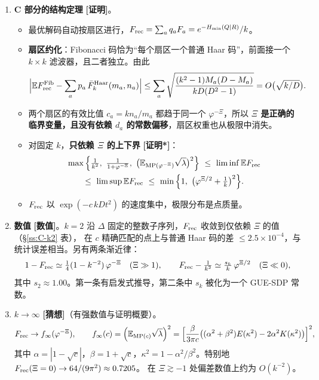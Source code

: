 \documentclass[11pt,a4paper,UTF8]{ctexart}
\newcommand{\E}{\mathbb{E}}
\newcommand{\Frec}{F_{\rm rec}}
\newcommand{\tagP}{\texorpdfstring{\textcolor{cP}{\textbf{[证明]}}}{[证明]}}
\newcommand{\tagPs}{\texorpdfstring{\textcolor{cPs}{\textbf{[证明*]}}}{[证明*]}}
\newcommand{\tagN}{\texorpdfstring{\textcolor{cN}{\textbf{[数值]}}}{[数值]}}
\newcommand{\tagC}{\texorpdfstring{\textcolor{cC}{\textbf{[猜想]}}}{[猜想]}}
\begin{document}
\begin{enumerate}[leftmargin=*,label=\textbf{\arabic*.}]
\item \textbf{C 部分的结构定理} \tagP。
\begin{itemize}
  \item 最优解码自动按扇区进行，$\Frec=\sum_aq_aF_a=e^{-H_{\min}(Q|R)}/k$。
  \item \textbf{扇区约化}：Fibonacci 码恰为“每个扇区一个普通 Haar 码”，前面接一个 $k\times k$ 滤波器，且二者独立。由此
  \[
  \Big|\E F^{\rm Fib}_{\rm rec}-\sum_ap_a\,\bar F^{\rm Haar}_k(m_a,n_a)\Big|
  \le\sum_a\sqrt{\frac{(k^2-1)M_a(D-M_a)}{kD(D^2-1)}}=O\big(\sqrt{k/D}\big).
  \]
  \item 两个扇区的有效比值 $c_a=kn_a/m_a$ 都趋于同一个 $\varphi^{-\Xi}$，所以 \textbf{$\Xi$ 是正确的临界变量，且没有依赖 $d_a$ 的常数偏移}，扇区权重也从极限中消失。
  \item 对固定 $k$，\textbf{只依赖 $\Xi$ 的上下界} \tagPs：
  \begin{multline*}
  \max\Big\{\tfrac1{k^2},\ \tfrac1{1+\varphi^{-\Xi}},\ \big(\E_{{\rm MP}(\varphi^{-\Xi})}\sqrt\lambda\big)^2\Big\}
  \ \le\ \liminf\E\Frec\\
  \le\ \limsup\E\Frec\ \le\ \min\Big\{1,\ \big(\varphi^{\Xi/2}+\tfrac1k\big)^2\Big\}.
  \end{multline*}
  \item $\Frec$ 以 $\exp(-c\,kDt^2)$ 的速度集中，极限分布是点质量。
\end{itemize}

\item \textbf{数值} \tagN。$k=2$ 沿 $\Delta$ 固定的整数子序列，$\Frec$ 收敛到仅依赖 $\Xi$ 的值（\S\ref{ss:C-k2} 表），
在 $c$ 精确匹配的点上与普通 Haar 码的差 $\le2.5\times10^{-4}$，与统计误差相当。另有两条渐近律：
\[
1-\Frec\simeq\tfrac14(1-k^{-2})\,\varphi^{-\Xi}\quad(\Xi\gg1),\qquad
\Frec-\tfrac1{k^2}\simeq\tfrac{s_k}{k}\,\varphi^{\Xi/2}\quad(\Xi\ll0),
\]
其中 $s_2\approx1.00$。第一条有启发式推导，第二条中 $s_k$ 被化为一个 GUE-SDP 常数。

\item \textbf{$k\to\infty$} \tagC（有强数值与证明概要）。
\[
\Frec\to f_\infty(\varphi^{-\Xi}),\qquad
f_\infty(c)=\Big(\E_{{\rm MP}(c)}\sqrt\lambda\Big)^2
=\Big[\frac{\beta}{3\pi c}\big((\alpha^2+\beta^2)E(\kappa^2)-2\alpha^2K(\kappa^2)\big)\Big]^2,
\]
其中 $\alpha=|1-\sqrt c|$，$\beta=1+\sqrt c$，$\kappa^2=1-\alpha^2/\beta^2$。特别地 $\Frec(\Xi=0)\to 64/(9\pi^2)\approx0.7205$。
在 $\Xi\gtrsim-1$ 处偏差数值上约为 $O(k^{-2})$。


\end{enumerate}
\end{document}
